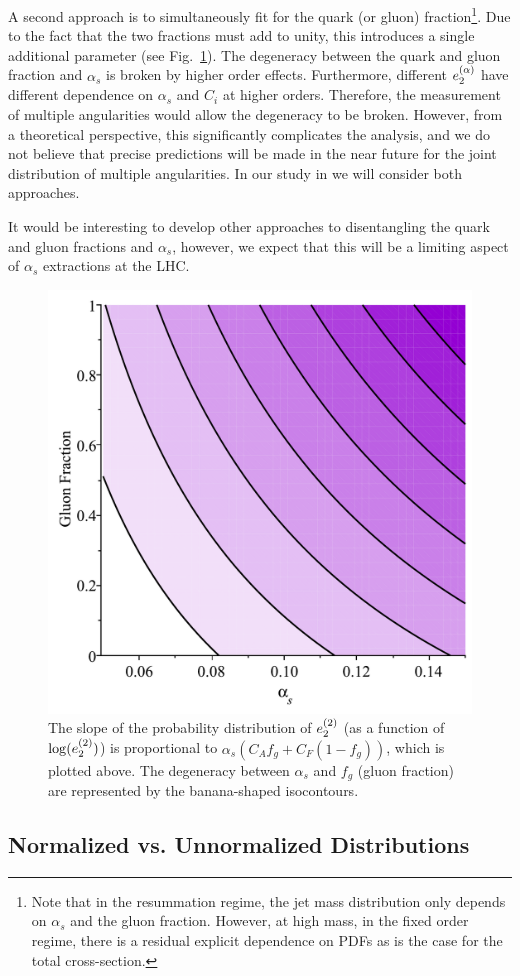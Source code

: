 A second approach is to simultaneously fit for the quark (or gluon)
fraction\footnote{Note that in the resummation regime, the jet mass distribution only depends on $\alpha_s$ and the gluon fraction.  However, at high mass, in the fixed order regime, there is a residual explicit dependence on PDFs as is the case for the total cross-section.}. Due to the fact that the two fractions must add to unity,
this introduces a single additional parameter (see
Fig.~\ref{fig:analyticbanana}). The degeneracy between the quark and
gluon fraction and $\alpha_s$ is broken by higher order
effects. Furthermore, different $e_{2}^{(\alpha)}$ have different
dependence on $\alpha_s$ and $C_i$ at higher orders. Therefore, the
measurement of multiple angularities would allow the degeneracy to be
broken. However, from a theoretical perspective, this significantly
complicates the analysis, and we do not believe that precise
predictions will be made in the near future for the joint distribution of multiple angularities. In our study in  we
will consider both approaches.

It would be interesting to develop other approaches to disentangling the quark and gluon fractions and $\alpha_s$, however, we expect that this will be a limiting aspect of $\alpha_s$ extractions at the LHC.


\begin{figure}[h!]
\begin{center}
\includegraphics[width = 0.4\columnwidth]{figures/Degeneracy}
\end{center}
\caption{The slope of the probability distribution of $e_{2}^{(2)}$ (as a function of $\log(e_{2}^{(2)})$) is proportional to $\alpha_s(C_Af_g+C_F(1-f_g))$, which is plotted above.  The degeneracy between $\alpha_s$ and $f_g$ (gluon fraction) are represented by the banana-shaped isocontours. }
\label{fig:analyticbanana}
\end{figure}


\subsection{Normalized vs. Unnormalized Distributions}

